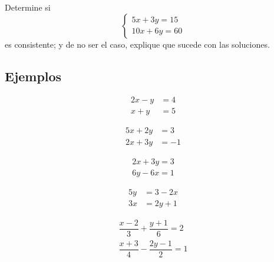 	Determine si 
	$$\begin{cases}
		5x+3y=15\\
		10x+6y=60
	\end{cases}$$
	es consistente; y de no ser el caso, explique que sucede con las soluciones.




\subsection{Ejemplos}


	\begin{problema}
		\begin{align*}
			2x-y&=4\\
			x+y&=5
		\end{align*}
		
	\end{problema}
	



	\begin{problema}
		\begin{align*}
			5x+2y&=3\\
			2x+3y&=-1
		\end{align*}
		
	\end{problema}
	



	\begin{problema}
		\begin{align*}
			2x+3y=3\\
			6y-6x=1
		\end{align*}
		
	\end{problema}
	



	\begin{problema}
		\begin{align*}
			5y&=3-2x\\
			3x&=2y+1
		\end{align*}
		
	\end{problema}
	



	\begin{problema}
		\begin{align*}
			\dfrac{x-2}{3}+\dfrac{y+1}{6}=2\\
			\dfrac{x+3}{4}-\dfrac{2y-1}{2}=1
		\end{align*}
		
	\end{problema}
	

